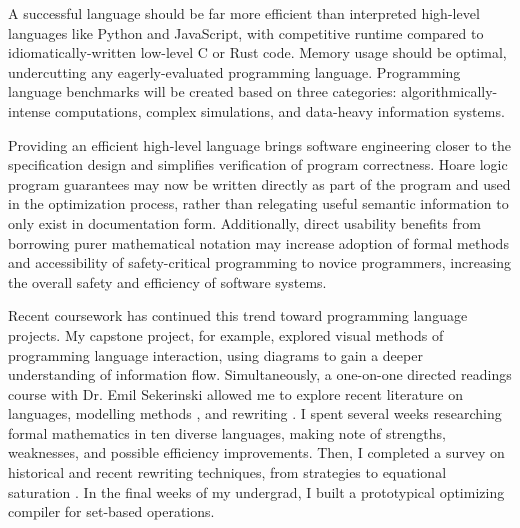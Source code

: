 \documentclass[12pt]{article}
\begin{document}
A successful language should be far more efficient than interpreted high-level languages like Python and JavaScript, with competitive runtime compared to idiomatically-written low-level C or Rust code. Memory usage should be optimal, undercutting any eagerly-evaluated programming language. Programming language benchmarks will be created based on three categories: algorithmically-intense computations, complex simulations, and data-heavy information systems.


Providing an efficient high-level language brings software engineering closer to the specification design and simplifies verification of program correctness. Hoare logic program guarantees may now be written directly as part of the program and used in the optimization process, rather than relegating useful semantic information to only exist in documentation form. Additionally, direct usability benefits from borrowing purer mathematical notation may increase adoption of formal methods and accessibility of safety-critical programming to novice programmers, increasing the overall safety and efficiency of software systems.








\pagebreak

Recent coursework has continued this trend toward programming language projects. My capstone project, for example, explored visual methods of programming language interaction, using diagrams to gain a deeper understanding of information flow. Simultaneously, a one-on-one directed readings course with Dr. Emil Sekerinski allowed me to explore recent literature on languages, modelling methods \cite{eventBBook}, and rewriting \cite{baader1998term}. I spent several weeks researching formal mathematics in ten diverse languages, making note of strengths, weaknesses, and possible efficiency improvements. Then, I completed a survey on historical and recent rewriting techniques, from strategies \cite{elco1998building} to equational saturation \cite{tate2009equality}. In the final weeks of my undergrad, I built a prototypical optimizing compiler for set-based operations.
\end{document}
